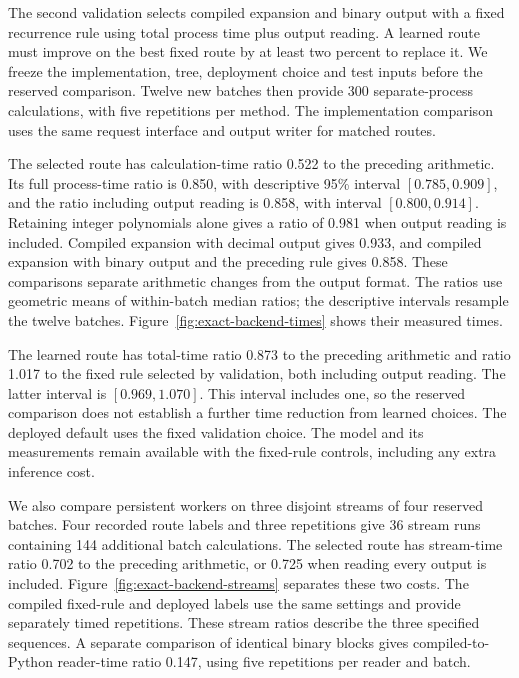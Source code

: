 The second validation selects compiled expansion and binary output with a fixed recurrence rule using total process time plus
output reading. A learned route must improve on the best fixed route by at least
two percent to replace it. We freeze the implementation, tree, deployment
choice and test inputs before the reserved comparison.
Twelve new batches then provide 300 separate-process calculations,
with five repetitions per method. The implementation comparison uses
the same request interface and output writer for matched routes.

The selected route has calculation-time ratio 0.522 to the preceding
arithmetic. Its full process-time ratio is 0.850, with descriptive
95\% interval \([0.785,0.909]\), and the ratio including output reading is
0.858, with interval \([0.800,0.914]\).
Retaining integer polynomials alone gives a ratio of 0.981 when
output reading is included. Compiled expansion with decimal output gives
0.933, and compiled expansion with binary output and the preceding
rule gives 0.858. These comparisons separate arithmetic changes
from the output format. The ratios use geometric means of within-batch
median ratios; the descriptive intervals resample the twelve batches.
Figure~\ref{fig:exact-backend-times} shows their measured times.

The learned route has total-time ratio 0.873 to the preceding
arithmetic and ratio 1.017 to the fixed rule selected by validation,
both including output reading. The latter interval is \([0.969,1.070]\).
This interval includes one, so the reserved comparison does not establish a further time reduction from learned choices. The deployed default uses the fixed validation choice.
The model and its measurements remain available with the fixed-rule
controls, including any extra inference cost.

We also compare persistent workers on three disjoint streams of four
reserved batches. Four recorded route labels and three repetitions give 36 stream runs
containing 144 additional batch calculations. The selected route has
stream-time ratio 0.702 to the preceding arithmetic, or
0.725 when reading every output is included.
Figure~\ref{fig:exact-backend-streams} separates these two costs.
The compiled fixed-rule and deployed labels use the same settings and
provide separately timed repetitions. These stream ratios describe the
three specified sequences.
A separate comparison of identical binary blocks gives compiled-to-Python
reader-time ratio 0.147, using five repetitions per reader and batch.

